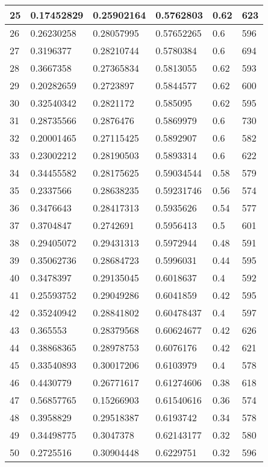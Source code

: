 \begin{longtable}{|l|l|l|l|l|l|}
25 & 0.17452829 & 0.25902164 & 0.5762803 & 0.62 & 623 \\ \hline 
26 & 0.26230258 & 0.28057995 & 0.57652265 & 0.6 & 596 \\ \hline 
27 & 0.3196377 & 0.28210744 & 0.5780384 & 0.6 & 694 \\ \hline 
28 & 0.3667358 & 0.27365834 & 0.5813055 & 0.62 & 593 \\ \hline 
29 & 0.20282659 & 0.2723897 & 0.5844577 & 0.62 & 600 \\ \hline 
30 & 0.32540342 & 0.2821172 & 0.585095 & 0.62 & 595 \\ \hline 
31 & 0.28735566 & 0.2876476 & 0.5869979 & 0.6 & 730 \\ \hline 
32 & 0.20001465 & 0.27115425 & 0.5892907 & 0.6 & 582 \\ \hline 
33 & 0.23002212 & 0.28190503 & 0.5893314 & 0.6 & 622 \\ \hline 
34 & 0.34455582 & 0.28175625 & 0.59034544 & 0.58 & 579 \\ \hline 
35 & 0.2337566 & 0.28638235 & 0.59231746 & 0.56 & 574 \\ \hline 
36 & 0.3476643 & 0.28417313 & 0.5935626 & 0.54 & 577 \\ \hline 
37 & 0.3704847 & 0.2742691 & 0.5956413 & 0.5 & 601 \\ \hline 
38 & 0.29405072 & 0.29431313 & 0.5972944 & 0.48 & 591 \\ \hline 
39 & 0.35062736 & 0.28684723 & 0.5996031 & 0.44 & 595 \\ \hline 
40 & 0.3478397 & 0.29135045 & 0.6018637 & 0.4 & 592 \\ \hline 
41 & 0.25593752 & 0.29049286 & 0.6041859 & 0.42 & 595 \\ \hline 
42 & 0.35240942 & 0.28841802 & 0.60478437 & 0.4 & 597 \\ \hline 
43 & 0.365553 & 0.28379568 & 0.60624677 & 0.42 & 626 \\ \hline 
44 & 0.38868365 & 0.28978753 & 0.6076176 & 0.42 & 621 \\ \hline 
45 & 0.33540893 & 0.30017206 & 0.6103979 & 0.4 & 578 \\ \hline 
46 & 0.4430779 & 0.26771617 & 0.61274606 & 0.38 & 618 \\ \hline 
47 & 0.56857765 & 0.15266903 & 0.61540616 & 0.36 & 574 \\ \hline 
48 & 0.3958829 & 0.29518387 & 0.6193742 & 0.34 & 578 \\ \hline 
49 & 0.34498775 & 0.3047378 & 0.62143177 & 0.32 & 580 \\ \hline 
50 & 0.2725516 & 0.30904448 & 0.6229751 & 0.32 & 596 \\ \hline 
\end{longtable}